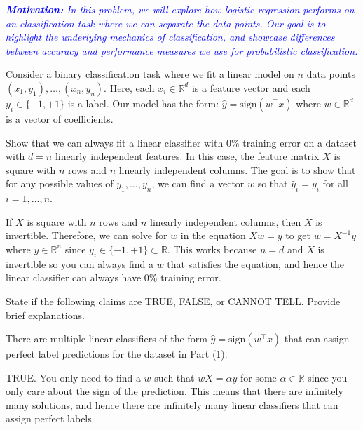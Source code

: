\documentclass{article}
\newcommand{\R}{\mathbb{R}}
\begin{document}
\begin{probset}
\begin{prob}
    \textit{\textcolor{blue}{\textbf{Motivation:} In this problem, we will explore how logistic regression performs on an classification task where we can separate the data points. Our goal is to highlight the underlying mechanics of classification, and showcase differences between accuracy and performance measures we use for probabilistic classification.}}

    Consider a binary classification task where we fit a linear model on $n$ data points $(x_1, y_1), \ldots, (x_n, y_n)$. Here, each $x_i \in \R^d$ is a feature vector and each $y_i \in \{-1, +1\}$ is a label. Our model has the form: $\hat{y} = \text{sign}(w^\top x)$ where $w \in \R^d$ is a vector of coefficients.

    \begin{subprobset}
        \begin{subprob}
            Show that we can always fit a linear classifier with 0\% training error on a dataset with $d = n$ linearly independent features. In this case, the feature matrix $X$ is square with $n$ rows and $n$ linearly independent columns. The goal is to show that for any possible values of $y_1, \ldots, y_n$, we can find a vector $w$ so that $\hat{y}_i = y_i$ for all $i = 1, \ldots, n$.

            \begin{soln}
                If $X$ is square with $n$ rows and $n$ linearly independent columns, then $X$ is invertible. Therefore, we can solve for $w$ in the equation $Xw = y$ to get $w = X^{-1}y$ where $y \in \R^n$ since $y_i \in \{-1, +1\} \subset \R$. This works because $n = d$ and $X$ is invertible so you can always find a $w$ that satisfies the equation, and hence the linear classifier can always have 0\% training error.
            \end{soln}
        \end{subprob}

        State if the following claims are TRUE, FALSE, or CANNOT TELL. Provide brief explanations.

        \begin{subprob}
            There are multiple linear classifiers of the form $\hat{y} = \text{sign}(w^\top x)$ that can assign perfect label predictions for the dataset in Part (1).

            \begin{soln}
                TRUE. You only need to find a $w$ such that $wX = \alpha y$ for some $\alpha \in \R$ since you only care about the sign of the prediction. This means that there are infinitely many solutions, and hence there are infinitely many linear classifiers that can assign perfect labels.
            \end{soln}
        \end{subprob}


\end{subprobset}
\end{prob}
\end{probset}
\end{document}
